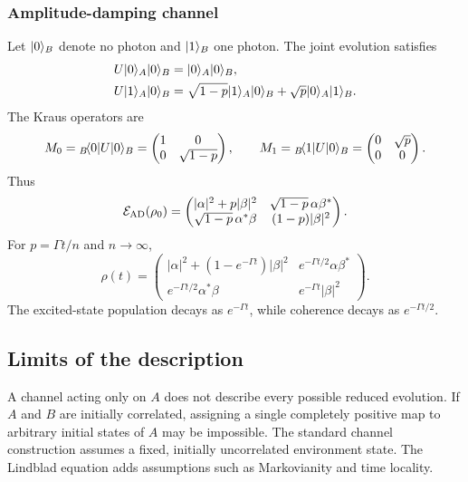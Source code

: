 \subsubsection{Amplitude-damping channel}
Let $|{0}\rangle_B$ denote no photon and $|{1}\rangle_B$ one photon. The joint
evolution satisfies
\begin{align}
 U|{0}\rangle_A|{0}\rangle_B&=|{0}\rangle_A|{0}\rangle_B,\\
 U|{1}\rangle_A|{0}\rangle_B
 &=\sqrt{1-p}|{1}\rangle_A|{0}\rangle_B
 +\sqrt p|{0}\rangle_A|{1}\rangle_B.
\end{align}
The Kraus operators are
\begin{equation}
 M_0={}_B\!\langle{0}|U|{0}\rangle_B
 =\begin{pmatrix}1&0\\0&\sqrt{1-p}\end{pmatrix},
 \qquad
 M_1={}_B\!\langle{1}|U|{0}\rangle_B
 =\begin{pmatrix}0&\sqrt p\\0&0\end{pmatrix}.
\end{equation}
Thus
\begin{equation}
 \mathcal{E}_{\mathrm{AD}}(\rho_0)
 =\begin{pmatrix}
 |\alpha|^2+p|\beta|^2&\sqrt{1-p}\,\alpha\beta^*\\
 \sqrt{1-p}\,\alpha^*\beta&(1-p)|\beta|^2
 \end{pmatrix}.
\end{equation}
For $p=\Gamma t/n$ and $n\to\infty$,
\begin{equation}
 \rho(t)=\begin{pmatrix}
 |\alpha|^2+(1-e^{-\Gamma t})|\beta|^2
 &e^{-\Gamma t/2}\alpha\beta^*\\
 e^{-\Gamma t/2}\alpha^*\beta&e^{-\Gamma t}|\beta|^2
 \end{pmatrix}.
\end{equation}
The excited-state population decays as $e^{-\Gamma t}$, while coherence
decays as $e^{-\Gamma t/2}$.

\subsection{Limits of the description}
A channel acting only on $A$ does not describe every possible reduced
evolution. If $A$ and $B$ are initially correlated, assigning a single
completely positive map to arbitrary initial states of $A$ may be impossible.
The standard channel construction assumes a fixed, initially uncorrelated
environment state. The Lindblad equation adds assumptions such as
Markovianity and time locality.



